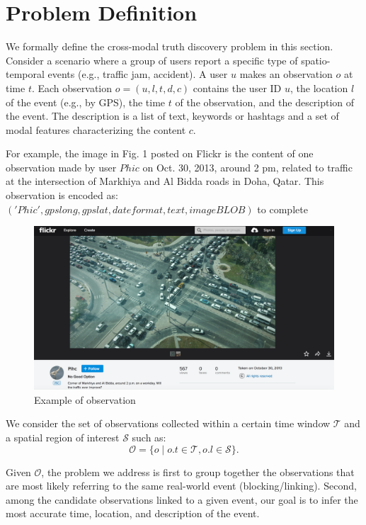 \section{Problem Definition}

We formally define the cross-modal truth discovery problem in this section.
Consider a scenario where a group of users report a specific type of spatio-temporal events (e.g., traffic jam, accident). A user $u$
makes an observation $o$ at time $t$. Each observation $o=(u,l,t,d,c)$ contains the user ID $u$, the location $l$ of the event (e.g., by GPS), the time $t$ of the observation, and the description of the event. The description is a list of  text, keywords or hashtags and  a set of modal features characterizing the content $c$. 

For example, the image  in Fig. 1 posted on Flickr is the content of one observation made by user $Phic$ on Oct. 30, 2013,  around 2 pm, related to traffic at the intersection of Markhiya and Al Bidda roads in Doha, Qatar. This observation is  encoded as: \\
$('Phic', gpslong,gpslat, dateformat,text, imageBLOB )$  to complete

\begin{figure}[t]
 \centerline{\includegraphics[scale=.45,width=.45\textwidth]{fig-example.png}}
\caption{ Example of observation}
\label{fig1}
\end{figure}

We consider the set of observations collected within a certain time window $\mathcal{T}$ and a spatial
region of interest $\mathcal{S}$ such as:
$$ \mathcal{O}=\{ o \mid o.t \in\mathcal{T}, o.l \in\mathcal{S} \}.$$

  Given $ \mathcal{O} $, the problem we address is first to group together the observations that are most likely referring to the same real-world event (blocking/linking). Second, among the candidate observations linked to a given event, our goal is to infer the most accurate time, location, and description of the event.

